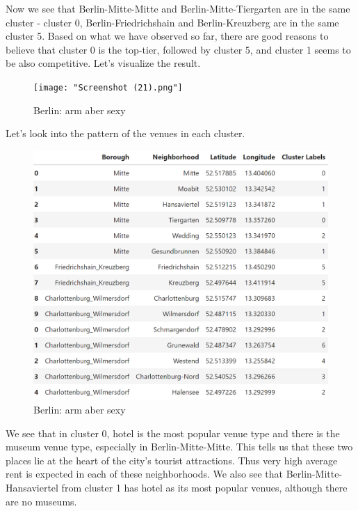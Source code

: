 \documentclass[11pt]{article}
\begin{document}
   

        
    Now we see that Berlin-Mitte-Mitte and Berlin-Mitte-Tiergarten are in
the same cluster - cluster 0, Berlin-Friedrichshain and Berlin-Kreuzberg
are in the same cluster 5. Based on what we have observed so far, there
are good reasons to believe that cluster 0 is the top-tier, followed by
cluster 5, and cluster 1 seems to be also competitive. Let's visualize
the result.

              \begin{figure}
\centering
\texttt{[image: "Screenshot (21).png"]}
\caption{Berlin: arm aber sexy}
\end{figure}

  
        
    Let's look into the pattern of the venues in each cluster.

                 \begin{figure}
\centering
\includegraphics[width=13cm]{"Screenshot (33).png"}
\caption{Berlin: arm aber sexy}
\end{figure}

        
    We see that in cluster 0, hotel is the most popular venue type and there
is the museum venue type, especially in Berlin-Mitte-Mitte. This tells
us that these two places lie at the heart of the city's tourist
attractions. Thus very high average rent is expected in each of these
neighborhoods. We also see that Berlin-Mitte-Hansaviertel from cluster 1
has hotel as its most popular venues, although there are no museums.
\end{document}
